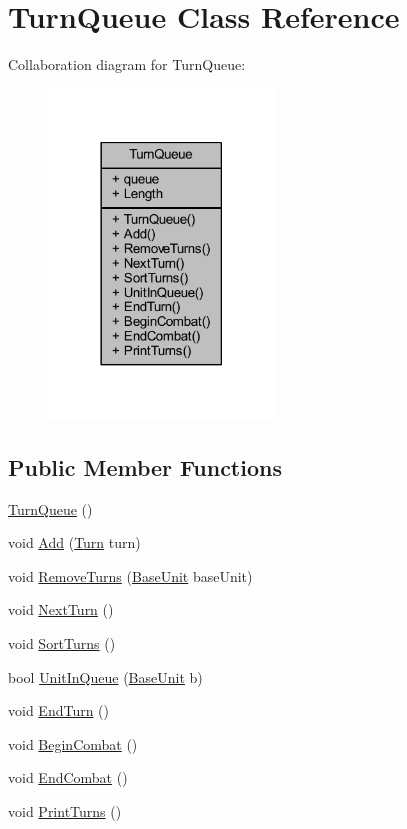 \hypertarget{class_turn_queue}{}\section{Turn\+Queue Class Reference}
\label{class_turn_queue}


Collaboration diagram for Turn\+Queue\+:\nopagebreak
\begin{figure}[H]
\begin{center}
\leavevmode
\includegraphics[width=170pt]{class_turn_queue__coll__graph}
\end{center}
\end{figure}
\subsection*{Public Member Functions}
\begin{DoxyCompactItemize}
\item 
\mbox{\hyperlink{class_turn_queue_a15bbf8315c0dc5ad3d211872f3de296b}{Turn\+Queue}} ()
\item 
void \mbox{\hyperlink{class_turn_queue_aa677cc3ae9812e45a5b7e8932c199e27}{Add}} (\mbox{\hyperlink{class_turn}{Turn}} turn)
\item 
void \mbox{\hyperlink{class_turn_queue_af6ee9af337f42a417812f4bc96f8d600}{Remove\+Turns}} (\mbox{\hyperlink{class_base_unit}{Base\+Unit}} base\+Unit)
\item 
void \mbox{\hyperlink{class_turn_queue_acae6f91ff8006307a04d4ee9362c1b7e}{Next\+Turn}} ()
\item 
void \mbox{\hyperlink{class_turn_queue_afadc89a92617f7b2ee4e93025d2f2217}{Sort\+Turns}} ()
\item 
bool \mbox{\hyperlink{class_turn_queue_a7f1a7e7055e613cbd17f1d76d9bfd261}{Unit\+In\+Queue}} (\mbox{\hyperlink{class_base_unit}{Base\+Unit}} b)
\item 
void \mbox{\hyperlink{class_turn_queue_aadfdf0f72201cdc985ad2dbb9520eaee}{End\+Turn}} ()
\item 
void \mbox{\hyperlink{class_turn_queue_a7de50ac6b689f76c71d808962b6d1b86}{Begin\+Combat}} ()
\item 
void \mbox{\hyperlink{class_turn_queue_a9b3696b9a7672bbb8a79e3f0dc3ef393}{End\+Combat}} ()
\item 
void \mbox{\hyperlink{class_turn_queue_ae1c735b715ec963c76f0291cb9629338}{Print\+Turns}} ()
\end{DoxyCompactItemize}
